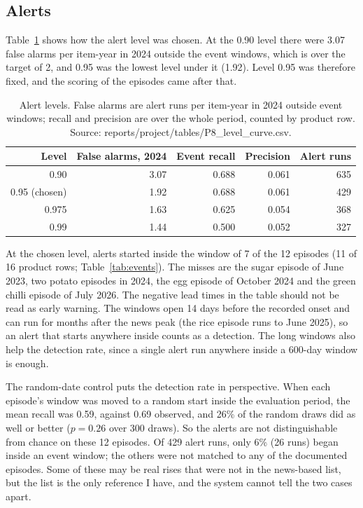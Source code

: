 \documentclass[12pt]{report}
\begin{document}
\subsection{Alerts}
Table~\ref{tab:level} shows how the alert level was chosen. At the 0.90 level there were 3.07 false alarms per item-year in 2024 outside the event windows, which is over the target of 2, and 0.95 was the lowest level under it (1.92). Level 0.95 was therefore fixed, and the scoring of the episodes came after that.

\begin{table}[H]\centering\small
\caption{Alert levels. False alarms are alert runs per item-year in 2024 outside event windows; recall and precision are over the whole period, counted by product row. Source: reports/project/tables/P8\_level\_curve.csv.}\label{tab:level}
\begin{tabular}{|r|r|r|r|r|}
\hline
\textbf{Level} & \textbf{False alarms, 2024} & \textbf{Event recall} & \textbf{Precision} & \textbf{Alert runs} \\
\hline
0.90 & 3.07 & 0.688 & 0.061 & 635 \\
\hline
0.95 (chosen) & 1.92 & 0.688 & 0.061 & 429 \\
\hline
0.975 & 1.63 & 0.625 & 0.054 & 368 \\
\hline
0.99 & 1.44 & 0.500 & 0.052 & 327 \\
\hline
\end{tabular}
\end{table}

At the chosen level, alerts started inside the window of 7 of the 12 episodes (11 of 16 product rows; Table~\ref{tab:events}). The misses are the sugar episode of June 2023, two potato episodes in 2024, the egg episode of October 2024 and the green chilli episode of July 2026. The negative lead times in the table should not be read as early warning. The windows open 14 days before the recorded onset and can run for months after the news peak (the rice episode runs to June 2025), so an alert that starts anywhere inside counts as a detection. The long windows also help the detection rate, since a single alert run anywhere inside a 600-day window is enough.

The random-date control puts the detection rate in perspective. When each episode's window was moved to a random start inside the evaluation period, the mean recall was 0.59, against 0.69 observed, and 26\% of the random draws did as well or better ($p=0.26$ over 300 draws). So the alerts are not distinguishable from chance on these 12 episodes. Of 429 alert runs, only 6\% (26 runs) began inside an event window; the others were not matched to any of the documented episodes. Some of these may be real rises that were not in the news-based list, but the list is the only reference I have, and the system cannot tell the two cases apart.
\end{document}
